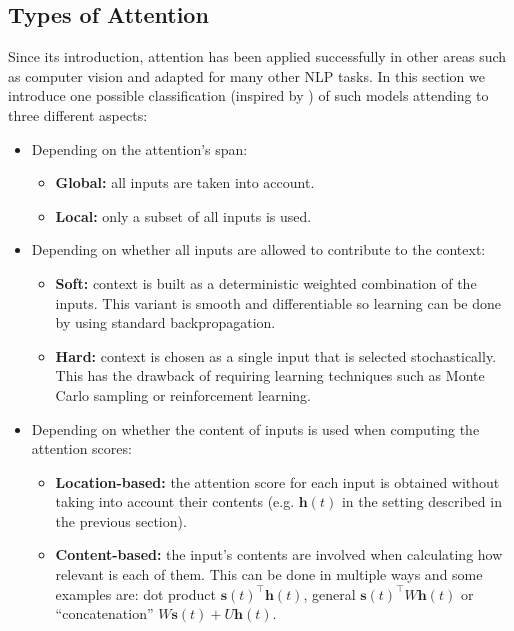 \subsection{Types of Attention}

Since its introduction, attention has been applied successfully in other areas such as computer vision \cite{xu2015show} and adapted for many other NLP tasks. In this section we introduce one possible classification (inspired by \cite{luongeffective}) of such models attending to three different aspects:

\begin{itemize}
	\item  Depending on the attention's span:
		\begin{itemize}
			\itemsep 0em
			\item  \textbf{Global:} all inputs are taken into account.
			\item  \textbf{Local:} only a subset of all inputs is used.
		\end{itemize}
	\item  Depending on whether all inputs are allowed to contribute to the context:
		\begin{itemize}
			\itemsep 0em
			\item  \textbf{Soft:} context is built as a deterministic weighted combination of the inputs. This variant is smooth and differentiable so learning can be done by using standard backpropagation.
			\item  \textbf{Hard:} context is chosen as a single input that is selected stochastically. This has the drawback of requiring learning techniques such as Monte Carlo sampling or reinforcement learning.
		\end{itemize}
	\item  Depending on whether the content of inputs is used when computing the attention scores:
		\begin{itemize}
			\itemsep 0em
			\item  \textbf{Location-based:} the attention score for each input is obtained without taking into account their contents (e.g. $\mathbf{h}(t)$ in the setting described in the previous section).
			\item  \textbf{Content-based:} the input's contents are involved when calculating how relevant is each of them. This can be done in multiple ways and some examples are: dot product $\mathbf{s}(t)^{\top}\mathbf{h}(t)$, general $\mathbf{s}(t)^{\top}W\mathbf{h}(t)$ or ``concatenation'' $W\mathbf{s}(t) + U\mathbf{h}(t)$.		
		\end{itemize}	
\end{itemize}

